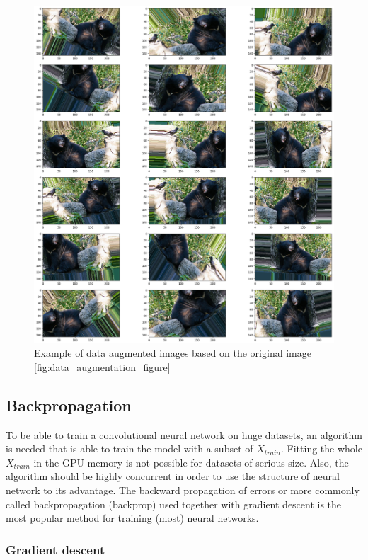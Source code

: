 \documentclass[times, utf8, diplomski]{fer}
\begin{document}
\begin{figure}
  \includegraphics[scale=0.35]{figures/da1.png}
  \centering
  \caption{Example of data augmented images based on the original image \ref{fig:data_augmentation_figure}}
  \label{fig:data_augmentation}
\end{figure}

\subsection{Backpropagation} \label{se:backprop}

To be able to train a convolutional neural network on huge datasets, an algorithm is needed that is able to train the model with a subset of $X_{train}$. Fitting the whole $X_{train}$ in the GPU memory is not possible for datasets of serious size. Also, the algorithm should be highly concurrent in order to use the structure of neural network to its advantage. The backward propagation of errors or more commonly called backpropagation (backprop) used together with gradient descent is the most popular method for training (most) neural networks.

\subsubsection{Gradient descent}
\end{document}
